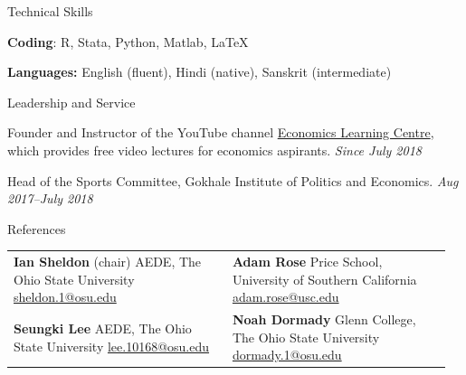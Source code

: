 \documentclass{resume} %
\begin{document}
\begin{rSection}{Technical Skills}{}{}
\vspace{-1em}
\item \textbf{Coding}: R, Stata, Python, Matlab, \LaTeX
\item \textbf{Languages:} English (fluent), Hindi (native), Sanskrit (intermediate)
\end{rSection}

\begin{rSection}{Leadership and Service}
\vspace{-1em}
\item Founder and Instructor of the YouTube channel \href{https://www.youtube.com/watch?v=XO6qivVX_QQ&t=184s}{Economics Learning Centre}, which provides free video lectures for economics aspirants. \hfill \textit{Since July 2018}


\item Head of the Sports Committee, Gokhale Institute of Politics and Economics. \hfill \textit{Aug 2017--July 2018}

\end{rSection}

\begin{rSection}{References}
\begin{tabular}{@{}>{\raggedright\arraybackslash}p{0.48\linewidth} >{\raggedright\arraybackslash}p{0.48\linewidth}@{}}
\textbf{Ian Sheldon} (chair) \newline
AEDE, The Ohio State University \newline
\href{mailto:sheldon.1@osu.edu}{sheldon.1@osu.edu}
&
\textbf{Adam Rose} \newline
Price School, University of Southern California \newline
\href{mailto:adam.rose@usc.edu}{adam.rose@usc.edu}
\\[1.5em]
\vspace{0.1mm}
\textbf{Seungki Lee} \newline
AEDE, The Ohio State University \newline
\href{mailto:lee.10168@osu.edu}{lee.10168@osu.edu}
& \vspace{0.1mm}
\textbf{Noah Dormady} \newline
Glenn College, The Ohio State University \newline
\href{mailto:dormady.1@osu.edu}{dormady.1@osu.edu}
\end{tabular}
\end{rSection}
\end{document}

